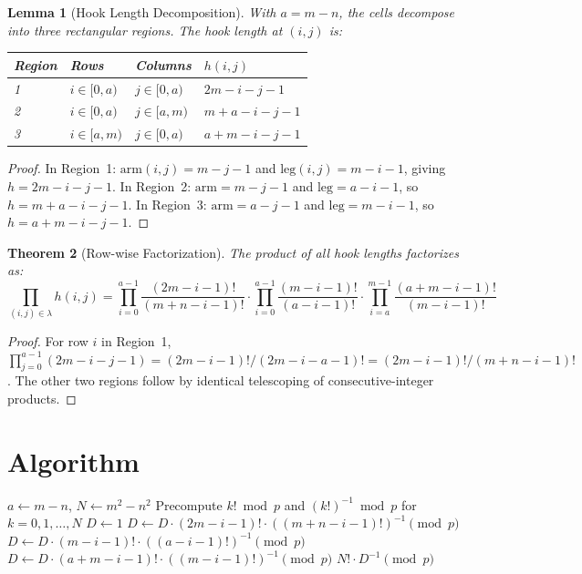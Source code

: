 \documentclass[11pt]{article}
\newtheorem{theorem}{Theorem}
\newtheorem{lemma}[theorem]{Lemma}
\newcommand{\LC}{\mathrm{LC}}
\begin{document}
\begin{lemma}[Hook Length Decomposition]
With $a = m - n$, the cells decompose into three rectangular regions. The hook length at $(i,j)$ is:
\begin{center}
\begin{tabular}{@{}llll@{}}
\toprule
Region & Rows & Columns & $h(i,j)$ \\
\midrule
1 & $i \in [0,a)$ & $j \in [0,a)$ & $2m - i - j - 1$ \\
2 & $i \in [0,a)$ & $j \in [a,m)$ & $m + a - i - j - 1$ \\
3 & $i \in [a,m)$ & $j \in [0,a)$ & $a + m - i - j - 1$ \\
\bottomrule
\end{tabular}
\end{center}
\end{lemma}

\begin{proof}
In Region~1: $\mathrm{arm}(i,j) = m - j - 1$ and $\mathrm{leg}(i,j) = m - i - 1$, giving $h = 2m - i - j - 1$. In Region~2: $\mathrm{arm} = m - j - 1$ and $\mathrm{leg} = a - i - 1$, so $h = m + a - i - j - 1$. In Region~3: $\mathrm{arm} = a - j - 1$ and $\mathrm{leg} = m - i - 1$, so $h = a + m - i - j - 1$.
\end{proof}

\begin{theorem}[Row-wise Factorization]
The product of all hook lengths factorizes as:
\[
\prod_{(i,j) \in \lambda} h(i,j) =
\prod_{i=0}^{a-1} \frac{(2m{-}i{-}1)!}{(m{+}n{-}i{-}1)!}
\cdot \prod_{i=0}^{a-1} \frac{(m{-}i{-}1)!}{(a{-}i{-}1)!}
\cdot \prod_{i=a}^{m-1} \frac{(a{+}m{-}i{-}1)!}{(m{-}i{-}1)!}
\]
\end{theorem}

\begin{proof}
For row $i$ in Region~1, $\prod_{j=0}^{a-1}(2m-i-j-1) = (2m-i-1)!/(2m-i-a-1)! = (2m-i-1)!/(m+n-i-1)!$. The other two regions follow by identical telescoping of consecutive-integer products.
\end{proof}

\section{Algorithm}

\begin{algorithm}[H]
\caption{Compute $\LC(m, n) \bmod p$}
\begin{algorithmic}[1]
\State $a \gets m - n$, \quad $N \gets m^2 - n^2$
\State Precompute $k! \bmod p$ and $(k!)^{-1} \bmod p$ for $k = 0, 1, \ldots, N$
\State $D \gets 1$
 
    \State $D \gets D \cdot (2m{-}i{-}1)! \cdot ((m{+}n{-}i{-}1)!)^{-1} \pmod{p}$
\EndFor
{} 
    \State $D \gets D \cdot (m{-}i{-}1)! \cdot ((a{-}i{-}1)!)^{-1} \pmod{p}$
\EndFor
{} 
    \State $D \gets D \cdot (a{+}m{-}i{-}1)! \cdot ((m{-}i{-}1)!)^{-1} \pmod{p}$
\EndFor
\State \Return $N! \cdot D^{-1} \pmod{p}$
\end{algorithmic}
\end{algorithm}
\end{document}
